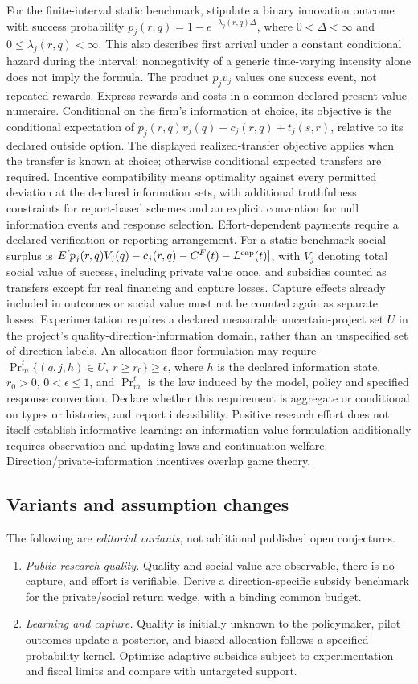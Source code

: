 \documentclass[11pt,a4paper]{article}
\begin{document}
For the finite-interval static benchmark, stipulate a binary innovation outcome with success probability \(p_j(r,q)=1-e^{-\lambda_j(r,q)\Delta}\), where \(0<\Delta<\infty\) and \(0\le\lambda_j(r,q)<\infty\). This also describes first arrival under a constant conditional hazard during the interval; nonnegativity of a generic time-varying intensity alone does not imply the formula. The product \(p_jv_j\) values one success event, not repeated rewards. Express rewards and costs in a common declared present-value numeraire. Conditional on the firm's information at choice, its objective is the conditional expectation of \(p_j(r,q)v_j(q)-c_j(r,q)+t_j(s,r)\), relative to its declared outside option. The displayed realized-transfer objective applies when the transfer is known at choice; otherwise conditional expected transfers are required. Incentive compatibility means optimality against every permitted deviation at the declared information sets, with additional truthfulness constraints for report-based schemes and an explicit convention for null information events and response selection. Effort-dependent payments require a declared verification or reporting arrangement. For a static benchmark social surplus is \(E[p_j(r,q)V_j(q)-c_j(r,q)-C^F(t)-L^{\rm cap}(t)]\), with \(V_j\) denoting total social value of success, including private value once, and subsidies counted as transfers except for real financing and capture losses. Capture effects already included in outcomes or social value must not be counted again as separate losses. Experimentation requires a declared measurable uncertain-project set \(U\) in the project's quality-direction-information domain, rather than an unspecified set of direction labels. An allocation-floor formulation may require \(\Pr_m^t\{(q,j,h)\in U,\ r\ge r_0\}\ge\epsilon\), where \(h\) is the declared information state, \(r_0>0\), \(0<\epsilon\le1\), and \(\Pr_m^t\) is the law induced by the model, policy and specified response convention. Declare whether this requirement is aggregate or conditional on types or histories, and report infeasibility. Positive research effort does not itself establish informative learning: an information-value formulation additionally requires observation and updating laws and continuation welfare. Direction/private-information incentives overlap game theory.
\subsection*{Variants and assumption changes}
The following are \emph{editorial variants}, not additional published open conjectures.
\begin{enumerate}
\item \emph{Public research quality.} Quality and social value are observable, there is no capture, and effort is verifiable. Derive a direction-specific subsidy benchmark for the private/social return wedge, with a binding common budget.
\item \emph{Learning and capture.} Quality is initially unknown to the policymaker, pilot outcomes update a posterior, and biased allocation follows a specified probability kernel. Optimize adaptive subsidies subject to experimentation and fiscal limits and compare with untargeted support.
\end{enumerate}
\end{document}

